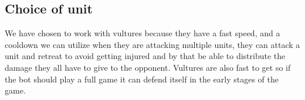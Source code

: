 \subsection{Choice of unit}

We have chosen to work with vultures because they have a fast speed, and a cooldown we can utilize when they are attacking multiple units, they can attack a unit and retreat to avoid getting injured and by that be able to distribute the damage they all have to give to the opponent. Vultures are also fast to get so if the bot should play a full game it can defend itself in the early stages of the game.

